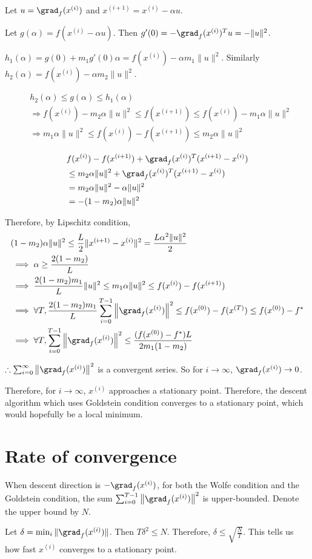Let $u = \grad_f(x^{(i)})$ and $x^{(i+1)} = x^{(i)} - \alpha u$.

Let $g(\alpha) = f(x^{(i)} - \alpha u)$.
Then $g'(0) = - \grad_f(x^{(i)})^T u = -\|u\|^2$.

$h_1(\alpha) = g(0) + m_1 g'(0) \alpha = f(x^{(i)}) - \alpha m_1 \|u\|^2$.
Similarly $h_2(\alpha) = f(x^{(i)}) - \alpha m_2 \|u\|^2$.

\begin{align*}
& h_2(\alpha) \le g(\alpha) \le h_1(\alpha)
\\ &\Rightarrow f(x^{(i)}) - m_2 \alpha \|u\|^2 \le f(x^{(i+1)}) \le f(x^{(i)}) - m_1 \alpha \|u\|^2
\\ &\Rightarrow m_1 \alpha \|u\|^2 \le f(x^{(i)}) - f(x^{(i+1)}) \le m_2 \alpha \|u\|^2
\end{align*}

\begin{align*}
& f(x^{(i)}) - f(x^{(i+1)}) + \grad_f(x^{(i)})^T(x^{(i+1)} - x^{(i)})
\\ &\le m_2 \alpha \|u\|^2 + \grad_f(x^{(i)})^T(x^{(i+1)} - x^{(i)})
\\ &= m_2 \alpha \|u\|^2 - \alpha \|u\|^2
\\ &= -(1-m_2) \alpha \|u\|^2
\end{align*}

Therefore, by Lipschitz condition,
\begin{align*}
& (1-m_2) \alpha \|u\|^2 \le \frac{L}{2} \|x^{(i+1)} - x^{(i)}\|^2 = \frac{L\alpha^2\|u\|^2}{2}
\\ &\implies \alpha \ge \frac{2(1-m_2)}{L}
\\ &\implies \frac{2(1-m_2)m_1}{L}\|u\|^2 \le m_1 \alpha \|u\|^2 \le f(x^{(i)}) - f(x^{(i+1)})
\\ &\implies \forall T, \frac{2(1-m_2)m_1}{L} \sum_{i=0}^{T-1} \left\|\grad_f(x^{(i)})\right\|^2
    \le f(x^{(0)}) - f(x^{(T)}) \le f(x^{(0)}) - f^*
\\ &\implies \forall T, \sum_{i=0}^{T-1} \left\|\grad_f(x^{(i)})\right\|^2
    \le \frac{(f(x^{(0)}) - f^*)L}{2m_1(1-m_2)}
\end{align*}

$\therefore \sum_{i=0}^{\infty} \left\| \grad_f(x^{(i)}) \right\|^2$
is a convergent series. So for $i \rightarrow \infty$, $\grad_f(x^{(i)}) \rightarrow 0$.

Therefore, for $i \rightarrow \infty$, $x^{(i)}$ approaches a stationary point.
Therefore, the descent algorithm which uses Goldstein condition converges to a stationary point,
which would hopefully be a local minimum.

\section{Rate of convergence}

When descent direction is $-\grad_f(x^{(i)})$,
for both the Wolfe condition and the Goldstein condition,
the sum $\sum_{i=0}^{T-1} \left\| \grad_f(x^{(i)}) \right\|^2$ is upper-bounded.
Denote the upper bound by $N$.

Let $\delta = \min_i \|\grad_f(x^{(i)})\|$.
Then $T\delta^2 \le N$. Therefore, $\delta \le \sqrt{\frac{N}{T}}$.
This tells us how fast $x^{(i)}$ converges to a stationary point.


